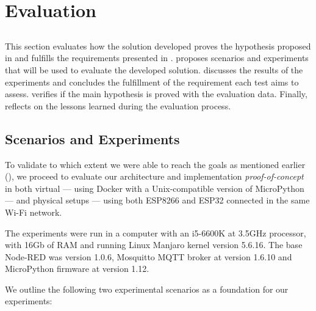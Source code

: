\chapter{Evaluation} \label{chap:evaluation}

\section*{}

\minitoc \mtcskip \noindent
This section evaluates how the solution developed proves the hypothesis proposed in  and fulfills the requirements presented in .  proposes scenarios and experiments that will be used to evaluate the developed solution.  discusses the results of the experiments and concludes the fulfillment of the requirement each test aims to assess.  verifies if the main hypothesis is proved with the evaluation data. Finally,  reflects on the lessons learned during the evaluation process. 

\section{Scenarios and Experiments}\label{sec:scenarios_experiments}

To validate to which extent we were able to reach the goals as mentioned earlier (\cf {}), we proceed to evaluate our architecture and implementation \textit{proof-of-concept} in both virtual --- using Docker with a Unix-compatible version of MicroPython --- and physical setups --- using both ESP8266 and ESP32 connected in the same Wi-Fi network.

The experiments were run in a computer with an i5-6600K at 3.5GHz processor, with 16Gb of RAM and running Linux Manjaro kernel version 5.6.16. The base Node-RED was version 1.0.6, Mosquitto MQTT broker at version 1.6.10 and MicroPython firmware at version 1.12.

We outline the following two experimental scenarios as a foundation for our experiments:

